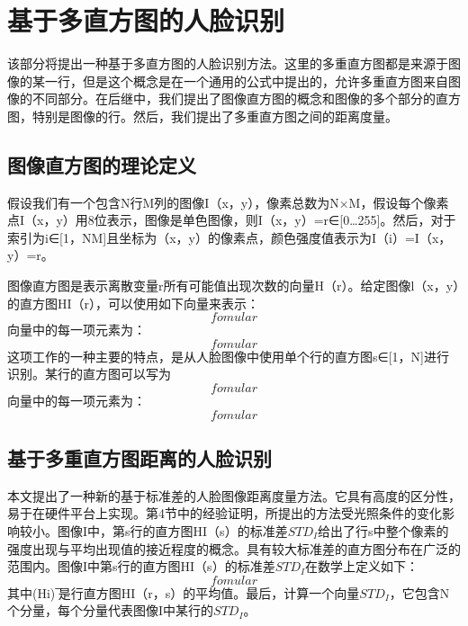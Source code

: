 
\chapter{基于多直方图的人脸识别}
\label{chap02}
该部分将提出一种基于多直方图的人脸识别方法。这里的多重直方图都是来源于图像的某一行，但是这个概念是在一个通用的公式中提出的，允许多重直方图来自图像的不同部分。在后继中，我们提出了图像直方图的概念和图像的多个部分的直方图，特别是图像的行。然后，我们提出了多重直方图之间的距离度量。
\section{图像直方图的理论定义}
假设我们有一个包含N行M列的图像I（x，y），像素总数为N×M，假设每个像素点I（x，y）用8位表示，图像是单色图像，则I（x，y）=r∈[0…255]。然后，对于索引为i∈[1，NM]且坐标为（x，y）的像素点，颜色强度值表示为I（i）=I（x，y）=r。

图像直方图是表示离散变量r所有可能值出现次数的向量H（r）。给定图像l（x，y）的直方图HI（r），可以使用如下向量来表示：
\begin{equation}
fomular
\end{equation}
向量中的每一项元素为：
\begin{equation}
fomular
\end{equation}
这项工作的一种主要的特点，是从人脸图像中使用单个行的直方图s∈[1，N]进行识别。某行的直方图可以写为
\begin{equation}
fomular
\end{equation}
向量中的每一项元素为：
\begin{equation}
fomular
\end{equation}
\section{基于多重直方图距离的人脸识别}
本文提出了一种新的基于标准差的人脸图像距离度量方法。它具有高度的区分性，易于在硬件平台上实现。第4节中的经验证明，所提出的方法受光照条件的变化影响较小。图像I中，第s行的直方图HI（s）的标准差$STD_I$给出了行s中整个像素的强度出现与平均出现值的接近程度的概念。具有较大标准差的直方图分布在广泛的范围内。图像I中第s行的直方图HI（s）的标准差$STD_I$在数学上定义如下：
\begin{equation}
fomular
\end{equation}
其中(Hi) ̅是行直方图HI（r，s）的平均值。最后，计算一个向量$STD_I$，它包含N个分量，每个分量代表图像I中某行的$STD_I$。

